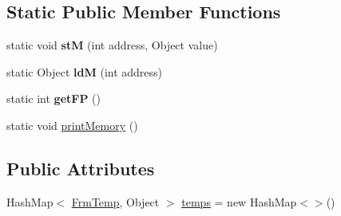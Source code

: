 \subsection*{Static Public Member Functions}
\begin{DoxyCompactItemize}
\item 
\mbox{\label{classcompiler_1_1interpreter_1_1_interpreter_a3b271e8491d53cb9106c3c56e16856ee}} 
static void {\bfseries stM} (int address, Object value)
\item 
\mbox{\label{classcompiler_1_1interpreter_1_1_interpreter_a0ba9dd4104344e35ca1315460a70532e}} 
static Object {\bfseries ldM} (int address)
\item 
\mbox{\label{classcompiler_1_1interpreter_1_1_interpreter_ab9163702ea248ad00c3cbe47fdc180b3}} 
static int {\bfseries get\+FP} ()
\item 
static void \hyperlink{classcompiler_1_1interpreter_1_1_interpreter_a63c615f46d843d0d4b4a735952196c8d}{print\+Memory} ()
\end{DoxyCompactItemize}
\subsection*{Public Attributes}
\begin{DoxyCompactItemize}
\item 
Hash\+Map$<$ \hyperlink{classcompiler_1_1frames_1_1_frm_temp}{Frm\+Temp}, Object $>$ \hyperlink{classcompiler_1_1interpreter_1_1_interpreter_afe4c853bb7246ff653b136d1e522f704}{temps} = new Hash\+Map$<$$>$()
\end{DoxyCompactItemize}
